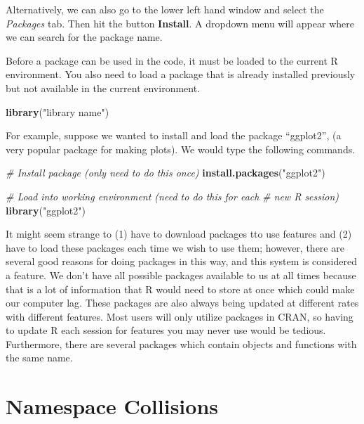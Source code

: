 \documentclass[
]{book}
\newenvironment{Shaded}{\begin{snugshade}}{\end{snugshade}}
\newcommand{\CommentTok}[1]{\textcolor[rgb]{0.56,0.35,0.01}{\textit{#1}}}
\newcommand{\KeywordTok}[1]{\textcolor[rgb]{0.13,0.29,0.53}{\textbf{#1}}}
\newcommand{\NormalTok}[1]{#1}
\newcommand{\StringTok}[1]{\textcolor[rgb]{0.31,0.60,0.02}{#1}}
\begin{document}
Alternatively, we can also go to the lower left hand window and select the \emph{Packages} tab. Then hit the button \textbf{Install}. A dropdown menu will appear where we can search for the package name.

Before a package can be used in the code, it must be loaded to the current R environment. You also need to load a package that is already installed previously but not available in the current environment.

\begin{Shaded}
\begin{Highlighting}[]
\KeywordTok{library}\NormalTok{(}\StringTok{"library name"}\NormalTok{)}
\end{Highlighting}
\end{Shaded}

For example, suppose we wanted to install and load the package ``ggplot2'', (a very popular package for making plots). We would type the following commands.

\begin{Shaded}
\begin{Highlighting}[]
\CommentTok{# Install package (only need to do this once)}
\KeywordTok{install.packages}\NormalTok{(}\StringTok{"ggplot2"}\NormalTok{)}

\CommentTok{# Load into working environment (need to do this for each}
\CommentTok{# new R session)}
\KeywordTok{library}\NormalTok{(}\StringTok{"ggplot2"}\NormalTok{)}
\end{Highlighting}
\end{Shaded}

It might seem strange to (1) have to download packages tto use features and (2) have to load these packages each time we wish to use them; however, there are several good reasons for doing packages in this way, and this system is considered a feature. We don't have all possible packages available to us at all times because that is a lot of information that R would need to store at once which could make our computer lag. These packages are also always being updated at different rates with different features. Most users will only utilize packages in CRAN, so having to update R each session for features you may never use would be tedious. Furthermore, there are several packages which contain objects and functions with the same name.

\hypertarget{namespace-collisions}{%
\section{Namespace Collisions}\label{namespace-collisions}}
\end{document}
